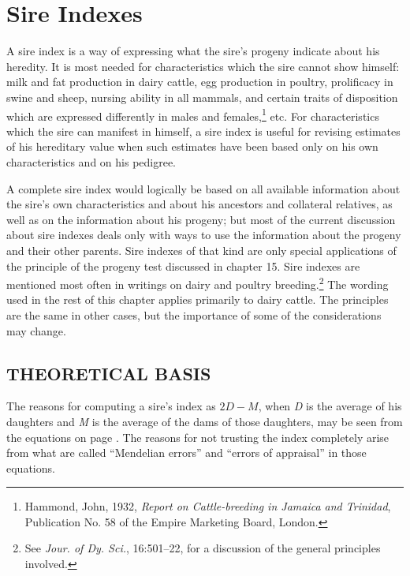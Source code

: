 \chapter{Sire Indexes}
\label{cha:Lush_Chapter_31}

A sire index is a way of expressing what the sire's progeny indicate
about his heredity. It is most needed for characteristics which the sire
cannot show himself: milk and fat production in dairy cattle, egg production
in poultry, prolificacy in swine and sheep, nursing ability in all
mammals, and certain traits of disposition which are expressed differently
in males and females,\footnote{Hammond, John, 1932, \textit{Report on
Cattle-breeding in Jamaica and Trinidad}, Publication No. 58 of the Empire
Marketing Board, London.} etc. For characteristics which the sire can
manifest in himself, a sire index is useful for revising estimates of his
hereditary value when such estimates have been based only on his own
characteristics and on his pedigree.

A complete sire index would logically be based on all available
information about the sire's own characteristics and about his ancestors
and collateral relatives, as well as on the information about his progeny;
but most of the current discussion about sire indexes deals only with
ways to use the information about the progeny and their other parents.
Sire indexes of that kind are only special applications of the principle
of the progeny test discussed in chapter 15. Sire indexes are mentioned
most often in writings on dairy and poultry breeding.\footnote{See
\textit{Jour. of Dy. Sci.}, 16:501--22, for a discussion of the general
principles involved.} The wording used in the rest of this chapter applies
primarily to dairy cattle. The principles are the same in other cases, but
the importance of some of the considerations may change.

\section*{THEORETICAL BASIS}

The reasons for computing a sire's index as $2D - M$, when \textit{D} is
the average of his daughters and \textit{M} is the average of the dams of
those daughters, may be seen from the equations on page \pageref{eqn-page-198}.
The reasons for not trusting the index completely arise from what are called
``Mendelian errors'' and ``errors of appraisal'' in those equations.

